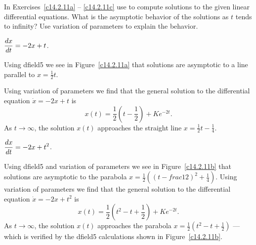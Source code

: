 \documentclass{ximera}
\begin{document}
\CEXER

\noindent In Exercises~\ref{c14.2.11a} -- \ref{c14.2.11c} use 
{\dfield} 
to compute solutions to the given linear differential equations.  What is 
the asymptotic behavior of the solutions as $t$ tends to infinity?  Use 
variation of parameters to explain the behavior.
\begin{exercise}   \label{c14.2.11a}
$\displaystyle\frac{dx}{dt} = -2 x + t$.

\begin{solution}
Using {\sf dfield5} we see in Figure~\ref{c14.2.11a} that
solutions are asymptotic to a line parallel to $x=\frac{1}{2}t$.

\begin{figure}[htb]
     \centerline{%
     }
\end{figure} 
Using variation of parameters we find that the general solution to the
differential equation $\dot{x}=-2x+t$ is 
\[
x(t) = \frac{1}{2}\left(t-\frac{1}{2}\right) +Ke^{-2t}.
\]
As $t\to\infty$, the solution $x(t)$ approaches the straight line 
$x= \frac{1}{2}t-\frac{1}{4}$.

\end{solution}
\end{exercise}
\begin{exercise}   \label{c14.2.11b}
$\displaystyle\frac{dx}{dt} = -2 x + t^2$.

\begin{solution}
Using {\sf dfield5} and variation of parameters we see in 
Figure~\ref{c14.2.11b} that solutions are asymptotic to the
parabola $x=\frac{1}{2}((t-frac{1}{2})^2+\frac{1}{4})$.
Using variation of parameters we find that the general solution to the
differential equation $\dot{x}=-2x+t^2$ is 
\[
x(t) = \frac{1}{2}\left(t^2-t+\frac{1}{2}\right) + Ke^{-2t}.
\]
As $t\to\infty$, the solution $x(t)$ approaches the parabola  
$x= \frac{1}{2}(t^2-t+\frac{1}{2})$ --- which is verified by the 
{\sf dfield5} calculations shown in Figure~\ref{c14.2.11b}.

\begin{figure}[htb]
     \centerline{%
     }
\end{figure} 

\end{solution}
\end{exercise}
\end{document}
